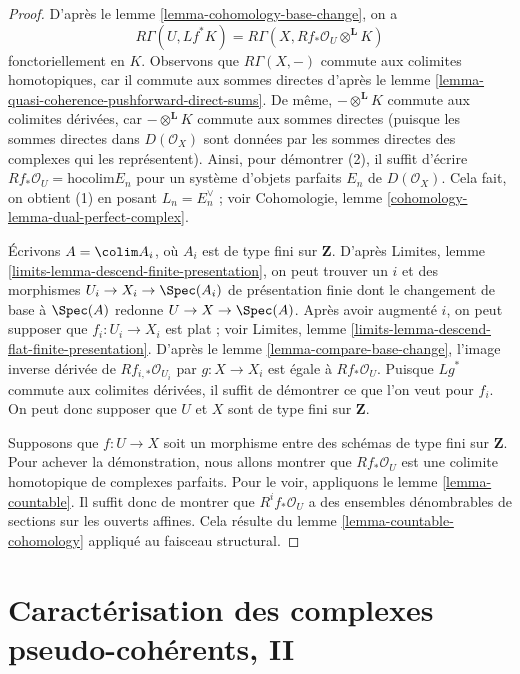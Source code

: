 \begin{proof}
D'après le lemme \ref{lemma-cohomology-base-change}, on a
$$
R\Gamma(U, Lf^*K) = R\Gamma(X, Rf_*\mathcal{O}_U \otimes^\mathbf{L} K)
$$
fonctoriellement en $K$. Observons que $R\Gamma(X, -)$ commute aux
colimites homotopiques, car il commute aux sommes directes d'après le
lemme \ref{lemma-quasi-coherence-pushforward-direct-sums}.
De même, $- \otimes^\mathbf{L} K$ commute aux colimites dérivées,
car $- \otimes^\mathbf{L} K$ commute aux sommes directes
(puisque les sommes directes dans $D(\mathcal{O}_X)$
sont données par les sommes directes des complexes qui les représentent).
Ainsi, pour démontrer (2), il suffit d'écrire
$Rf_*\mathcal{O}_U = \text{hocolim} E_n$ pour un système
d'objets parfaits $E_n$ de $D(\mathcal{O}_X)$. Cela fait,
on obtient (1) en posant $L_n = E_n^\vee$ ; voir
Cohomologie, lemme \ref{cohomology-lemma-dual-perfect-complex}.

\medskip\noindent
Écrivons $A = \colim A_i$, où $A_i$ est de type fini sur $\mathbf{Z}$.
D'après Limites, lemme \ref{limits-lemma-descend-finite-presentation},
on peut trouver un $i$ et des morphismes $U_i \to X_i \to \Spec(A_i)$
de présentation finie dont le changement de base à $\Spec(A)$ redonne
$U \to X \to \Spec(A)$.
Après avoir augmenté $i$, on peut supposer que $f_i : U_i \to X_i$ est
plat ; voir Limites, lemme \ref{limits-lemma-descend-flat-finite-presentation}.
D'après le lemme \ref{lemma-compare-base-change},
l'image inverse dérivée de $Rf_{i, *}\mathcal{O}_{U_i}$
par $g : X \to X_i$ est égale à $Rf_*\mathcal{O}_U$.
Puisque $Lg^*$ commute aux colimites dérivées, il suffit
de démontrer ce que l'on veut pour $f_i$. On peut donc supposer que
$U$ et $X$ sont de type fini sur $\mathbf{Z}$.

\medskip\noindent
Supposons que $f : U \to X$ soit un morphisme entre des schémas de type fini sur $\mathbf{Z}$.
Pour achever la démonstration, nous allons montrer que $Rf_*\mathcal{O}_U$ est une
colimite homotopique de complexes parfaits. Pour le voir, appliquons le lemme \ref{lemma-countable}.
Il suffit donc de montrer que $R^if_*\mathcal{O}_U$
a des ensembles dénombrables de sections sur les ouverts affines.
Cela résulte du lemme \ref{lemma-countable-cohomology}
appliqué au faisceau structural.
\end{proof}




\section{Caractérisation des complexes pseudo-cohérents, II}
\label{section-pseudo-coherent}

